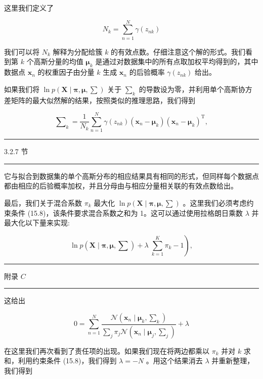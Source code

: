 \documentclass[10pt]{article}
\newcommand{\HRule}{\begin{center}\rule{0.9\linewidth}{0.2mm}\end{center}}
\begin{document}
这里我们定义了

\[
{N}_{k} = \mathop{\sum }\limits_{{n = 1}}^{N}\gamma \left( {z}_{nk}\right)  \tag{15.17}
\]

我们可以将 \({N}_{k}\) 解释为分配给簇 \(k\) 的有效点数。仔细注意这个解的形式。我们看到第 \(k\) 个高斯分量的均值 \({\mathbf{\mu }}_{k}\) 是通过对数据集中的所有点取加权平均得到的，其中数据点 \({\mathbf{x}}_{n}\) 的权重因子由分量 \(k\) 生成 \({\mathbf{x}}_{n}\) 的后验概率 \(\gamma \left( {z}_{nk}\right)\) 给出。

如果我们将 \(\ln p\left( {\mathbf{X} \mid  \mathbf{\pi },\mathbf{\mu },\mathbf{\sum }}\right)\) 关于 \({\mathbf{\sum }}_{k}\) 的导数设为零，并利用单个高斯协方差矩阵的最大似然解的结果，按照类似的推理思路，我们得到

\[
{\mathbf{\sum }}_{k} = \frac{1}{{N}_{k}}\mathop{\sum }\limits_{{n = 1}}^{N}\gamma \left( {z}_{nk}\right) \left( {{\mathbf{x}}_{n} - {\mathbf{\mu }}_{k}}\right) {\left( {\mathbf{x}}_{n} - {\mathbf{\mu }}_{k}\right) }^{\mathrm{T}}, \tag{15.18}
\]

\HRule

3.2.7 节

\HRule

它与拟合到数据集的单个高斯分布的相应结果具有相同的形式，但同样每个数据点都由相应的后验概率加权，并且分母由与相应分量相关联的有效点数给出。

最后，我们关于混合系数 \({\pi }_{k}\) 最大化 \(\ln p\left( {\mathbf{X} \mid  \mathbf{\pi },\mathbf{\mu },\mathbf{\sum }}\right)\) 。这里我们必须考虑约束条件 (15.8)，该条件要求混合系数之和为 1。这可以通过使用拉格朗日乘数 \(\lambda\) 并最大化以下量来实现:

\[
\left. {\ln p\left( {\mathbf{X} \mid  \mathbf{\pi },\mathbf{\mu },\mathbf{\sum }}\right)  + \lambda \;\mathop{\sum }\limits_{{k = 1}}^{K}{\pi }_{k} - 1}\right) , \tag{15.19}
\]

\HRule

附录 \(C\)

\HRule

这给出

\[
0 = \mathop{\sum }\limits_{{n = 1}}^{N}\frac{\mathcal{N}\left( {{\mathbf{x}}_{n} \mid  {\mathbf{\mu }}_{k},{\mathbf{\sum }}_{k}}\right) }{\mathop{\sum }\limits_{j}{\pi }_{j}\mathcal{N}\left( {{\mathbf{x}}_{n} \mid  {\mathbf{\mu }}_{j},{\mathbf{\sum }}_{j}}\right) } + \lambda  \tag{15.20}
\]

在这里我们再次看到了责任项的出现。如果我们现在将两边都乘以 \({\pi }_{k}\) 并对 \(k\) 求和，利用约束条件 (15.8)，我们得到 \(\lambda  =  - N\) 。用这个结果消去 \(\lambda\) 并重新整理，我们得到
\end{document}
